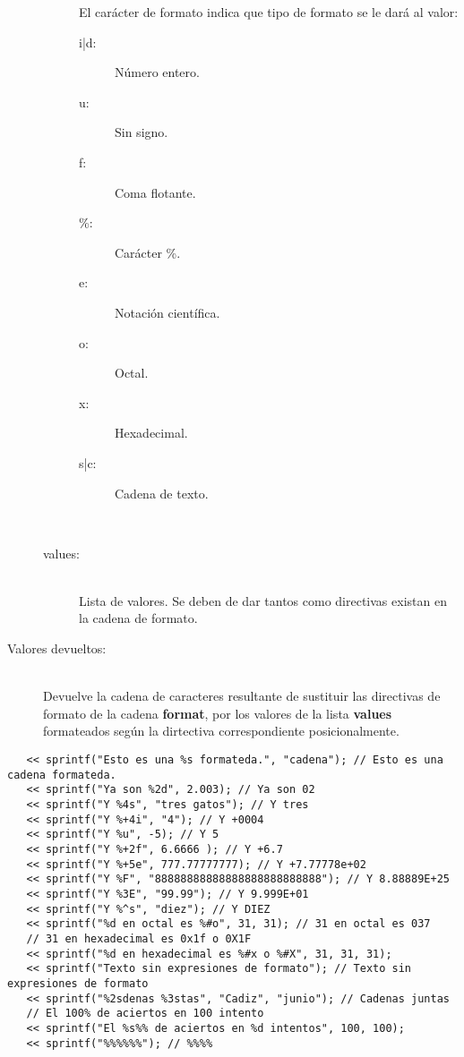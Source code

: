 \begin{framed}
\begin{description}
\begin{description}
		El carácter de formato indica que tipo de formato se le dará al valor: 
		\begin{description}
			\item[  i|d:] Número entero.
			\item[  u:] Sin signo.
			\item[  f:] Coma flotante.
			\item[  \%:] Carácter \%.
			\item[  e:] Notación científica.
			\item[  o:] Octal.
			\item[  x:] Hexadecimal.
			\item[  s|c:] Cadena de texto.
		\end{description} \hfill \\
   \item[values:] \hfill \\ Lista de valores. Se deben de dar tantos como directivas existan en la cadena de formato.
      
   \end{description}
\item[Valores devueltos:] \hfill \\
   Devuelve la cadena de caracteres resultante de sustituir las directivas de formato de la cadena \textbf{format}, por los valores  de la lista \textbf{values} formateados 
   según la dirtectiva correspondiente posicionalmente.
\end{description}
\end{framed}

\begin{lstlisting}   
   << sprintf("Esto es una %s formateda.", "cadena"); // Esto es una cadena formateda.
   << sprintf("Ya son %2d", 2.003); // Ya son 02
   << sprintf("Y %4s", "tres gatos"); // Y tres
   << sprintf("Y %+4i", "4"); // Y +0004
   << sprintf("Y %u", -5); // Y 5
   << sprintf("Y %+2f", 6.6666 ); // Y +6.7
   << sprintf("Y %+5e", 777.77777777); // Y +7.77778e+02
   << sprintf("Y %F", "88888888888888888888888888"); // Y 8.88889E+25
   << sprintf("Y %3E", "99.99"); // Y 9.999E+01
   << sprintf("Y %^s", "diez"); // Y DIEZ
   << sprintf("%d en octal es %#o", 31, 31); // 31 en octal es 037
   // 31 en hexadecimal es 0x1f o 0X1F
   << sprintf("%d en hexadecimal es %#x o %#X", 31, 31, 31); 
   << sprintf("Texto sin expresiones de formato"); // Texto sin expresiones de formato
   << sprintf("%2sdenas %3stas", "Cadiz", "junio"); // Cadenas juntas
   // El 100% de aciertos en 100 intento
   << sprintf("El %s%% de aciertos en %d intentos", 100, 100); 
   << sprintf("%%%%%%"); // %%%%
\end{lstlisting}

